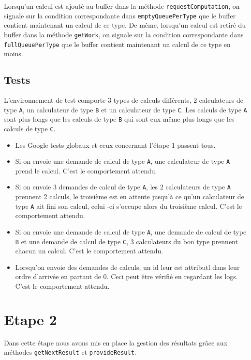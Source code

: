 \documentclass{article}
\begin{document}
Lorsqu'un calcul est ajouté au buffer dans la méthode \texttt{requestComputation}, on signale sur la condition correspondante
dans \texttt{emptyQueuePerType} que le buffer contient maintenant un calcul de ce type. De même, lorsqu'un calcul est
retiré du buffer dans la méthode \texttt{getWork}, on signale sur la condition correspondante dans \texttt{fullQueuePerType}
que le buffer contient maintenant un calcul de ce type en moins.

\subsection{Tests}
L'environnement de test comporte 3 types de calculs différents, 2 calculateurs de type \texttt{A}, un
calculateur de type \texttt{B} et un calculateur de type \texttt{C}. Les calculs de type \texttt{A} sont plus longs
que les calculs de type \texttt{B} qui sont eux même plus longs que les calculs de type \texttt{C}.

\begin{itemize}
    \item Les Google tests globaux et ceux concernant l'étape 1 passent tous.
    \item Si on envoie une demande de calcul de type \texttt{A}, une calculateur de type \texttt{A} prend le calcul.
    C'est le comportement attendu.
    \item Si on envoie 3 demandes de calcul de type \texttt{A}, les 2 calculateurs de type \texttt{A} prennent 2
    calculs, le troisième est en attente jusqu'à ce qu'un calculateur de type \texttt{A} ait fini son calcul, celui
    -ci s'occupe alors du troisième calcul. C'est le comportement attendu.
    \item Si on envoie une demande de calcul de type \texttt{A}, une demande de calcul de type \texttt{B} et une
    demande de calcul de type \texttt{C}, 3 calculateurs du bon type prennent chacun un calcul. C'est le comportement attendu.
    \item Lorsqu'on envoie des demandes de calculs, un id leur est attributl dans leur ordre d'arrivée en partant de
    0. Ceci peut être vérifié en regardant les logs. C'est le comportement attendu.
\end{itemize}

\section{Etape 2}
Dans cette étape nous avons mis en place la gestion des résultats grâce aux méthodes \texttt{getNextResult} et
\texttt{provideResult}.
\end{document}
